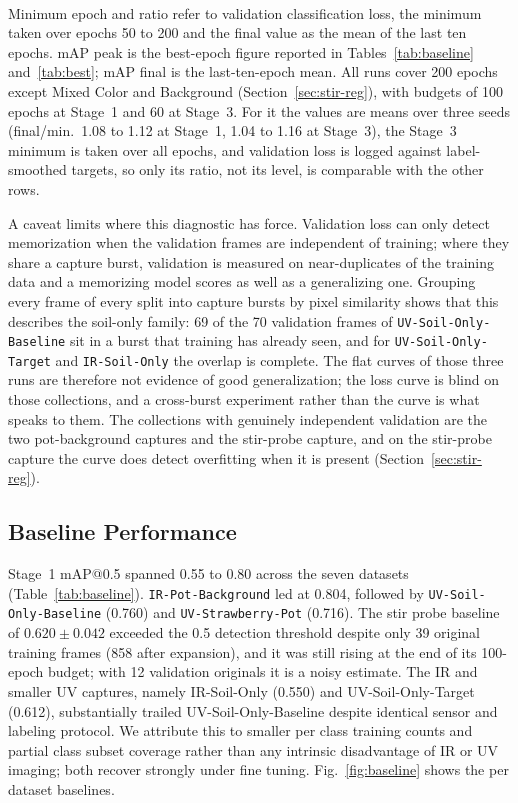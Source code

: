 ﻿\documentclass[journal]{IEEEtran}
\begin{document}
\begin{table}[!t]
\begin{tabular}{l c c c c}
\bottomrule
\end{tabular}
\\[2pt]
\parbox{\columnwidth}{\footnotesize Minimum epoch and ratio refer to validation classification loss, the minimum taken over epochs 50 to 200 and the final value as the mean of the last ten epochs. mAP peak is the best-epoch figure reported in Tables~\ref{tab:baseline} and~\ref{tab:best}; mAP final is the last-ten-epoch mean. All runs cover 200 epochs except Mixed Color and Background (Section~\ref{sec:stir-reg}), with budgets of 100 epochs at Stage~1 and 60 at Stage~3. For it the values are means over three seeds (final/min.\ 1.08 to 1.12 at Stage~1, 1.04 to 1.16 at Stage~3), the Stage~3 minimum is taken over all epochs, and validation loss is logged against label-smoothed targets, so only its ratio, not its level, is comparable with the other rows.}
\end{table}


A caveat limits where this diagnostic has force. Validation loss can only detect memorization when the validation frames are independent of training; where they share a capture burst, validation is measured on near-duplicates of the training data and a memorizing model scores as well as a generalizing one. Grouping every frame of every split into capture bursts by pixel similarity shows that this describes the soil-only family: 69 of the 70 validation frames of \texttt{UV-Soil-Only-Baseline} sit in a burst that training has already seen, and for \texttt{UV-Soil-Only-Target} and \texttt{IR-Soil-Only} the overlap is complete. The flat curves of those three runs are therefore not evidence of good generalization; the loss curve is blind on those collections, and a cross-burst experiment rather than the curve is what speaks to them. The collections with genuinely independent validation are the two pot-background captures and the stir-probe capture, and on the stir-probe capture the curve does detect overfitting when it is present (Section~\ref{sec:stir-reg}).

\subsection{Baseline Performance}
Stage~1 mAP@0.5 spanned 0.55 to 0.80 across the seven datasets (Table~\ref{tab:baseline}). \texttt{IR-Pot-Background} led at 0.804, followed by \texttt{UV-Soil-Only-Baseline} (0.760) and \texttt{UV-Strawberry-Pot} (0.716). The stir probe baseline of $0.620 \pm 0.042$ exceeded the 0.5 detection threshold despite only 39 original training frames (858 after expansion), and it was still rising at the end of its 100-epoch budget; with 12 validation originals it is a noisy estimate. The IR and smaller UV captures, namely IR-Soil-Only (0.550) and UV-Soil-Only-Target (0.612), substantially trailed UV-Soil-Only-Baseline despite identical sensor and labeling protocol. We attribute this to smaller per class training counts and partial class subset coverage rather than any intrinsic disadvantage of IR or UV imaging; both recover strongly under fine tuning. Fig.~\ref{fig:baseline} shows the per dataset baselines.
\end{document}
